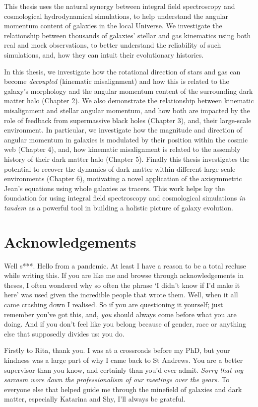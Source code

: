 \documentclass[11pt]{book}
\begin{document}
This thesis uses the natural synergy between integral field spectroscopy and cosmological hydrodynamical simulations, to help understand the angular momentum content of galaxies in the local Universe. We investigate the relationship between thousands of galaxies' stellar and gas kinematics using both real and mock observations, to better understand the reliability of such simulations, and, how they can intuit their evolutionary histories.

In this thesis, we investigate how the rotational direction of stars and gas can become \textit{decoupled} (kinematic misalignment) and how this is related to the galaxy's morphology and the angular momentum content of the surrounding dark matter halo (Chapter 2). We also demonstrate the relationship between kinematic misalignment and stellar angular momentum, and how both are impacted by the role of feedback from supermassive black holes (Chapter 3), and, their large-scale environment. In particular, we investigate how the magnitude and direction of angular momentum in galaxies is modulated by their position within the cosmic web (Chapter 4), and, how kinematic misalignment is related to the assembly history of their dark matter halo (Chapter 5). Finally this thesis investigates the potential to recover the dynamics of dark matter within different large-scale environments (Chapter 6), motivating a novel application of the axisymmetric Jean's equations using whole galaxies as tracers. This work helps lay the foundation for using integral field spectroscopy and cosmological simulations \textit{in tandem} as a powerful tool in building a holistic picture of galaxy evolution.

\chapter{Acknowledgements}

Well s***. Hello from a pandemic. At least I have a reason to be a total recluse while writing this. If you are like me and browse through acknowledgements in theses, I often wondered why so often the phrase `I didn't know if I'd make it here' was used given the incredible people that wrote them. Well, when it all came crashing down I realised. So if you are questioning it yourself; just remember you've got this, and, \textit{you} should always come before what you are doing. And if you don't feel like you belong because of gender, race or anything else that supposedly divides us: you do. 

Firstly to Rita, thank you. I was at a crossroads before my PhD, but your kindness was a large part of why I came back to St Andrews. You are a better supervisor than you know, and certainly than you'd ever admit. \textit{Sorry that my sarcasm wore down the professionalism of our meetings over the years.} To everyone else that helped guide me through the minefield of galaxies and dark matter, especially Katarina and Shy, I'll always be grateful.
\end{document}
